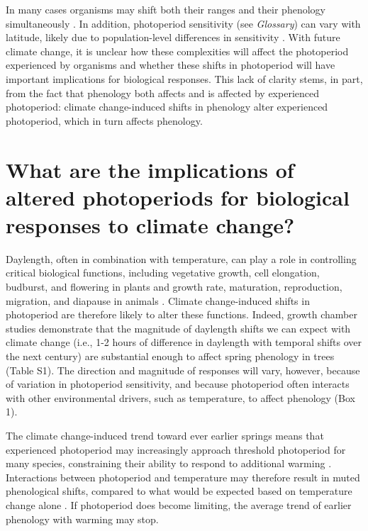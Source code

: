 \documentclass{article}
\begin{document}
\par In many cases organisms may shift both their ranges and their phenology simultaneously \citep[i.e., due to new climatic conditions,][]{duputie2015,grevstad2015}. In addition, photoperiod sensitivity (see \emph{Glossary}) can vary with latitude, likely due to population-level differences in sensitivity \citep{gauzere2017,saikkonen2012,Caffarra:2011b,bradshaw2007,Vihera-Aarnio:2006aa,Partanen:2005aa,Howe:1996}.
With future climate change, it is unclear how these complexities will affect the photoperiod experienced by organisms and whether these shifts in photoperiod will have important implications for biological responses. This lack of clarity stems, in part, from the fact that phenology both affects and is affected by experienced photoperiod: climate change-induced shifts in phenology alter experienced photoperiod, which in turn affects phenology. 

\section*{What are the implications of altered photoperiods for biological responses to climate change?}
\par Daylength, often in combination with temperature, can play a role in controlling critical biological functions, including vegetative growth, cell elongation, budburst, and flowering in plants \citep{fu2019,Heide:2012aa,Heide:2011aa,Hsu:2011,sidaway2010,mimura2007,Linkosalo:2006aa,erwin1998,Ashby:1962aa} and growth rate, maturation, reproduction, migration, and diapause in animals \citep{dunn2019,winkler2014,zydlewski2014,dardente2012,tobin2008,bradshaw2006,ben1997,muir1994,saunders1970,dawbin1966}. Climate change-induced shifts in photoperiod are therefore likely to alter these functions. 
Indeed, growth chamber studies demonstrate that the magnitude of daylength shifts we can expect with climate change (i.e., 1-2 hours of difference in daylength with temporal shifts over the next century) are substantial enough to affect spring phenology in trees (Table S1). The direction and magnitude of responses will vary, however, because of variation in photoperiod sensitivity, and because photoperiod often interacts with other environmental drivers, such as temperature, to affect phenology (Box 1). 
\par The climate change-induced trend toward ever earlier springs means that experienced photoperiod may increasingly approach threshold photoperiod for many species, constraining their ability to respond to additional warming \citep{fu2019,vitasse2013,koerner2010b,Morin:2010aa,Nienstaedt:1966aa}. Interactions between photoperiod and temperature may therefore result in muted phenological shifts, compared to what would be expected based on temperature change alone \citep{koerner2010b,mimura2007,wareing1956}. If photoperiod does become limiting, the average trend of earlier phenology with warming \citep{ovaskainen2013,polgar2013,penuelas2002,menzel2000} may stop.
\end{document}
